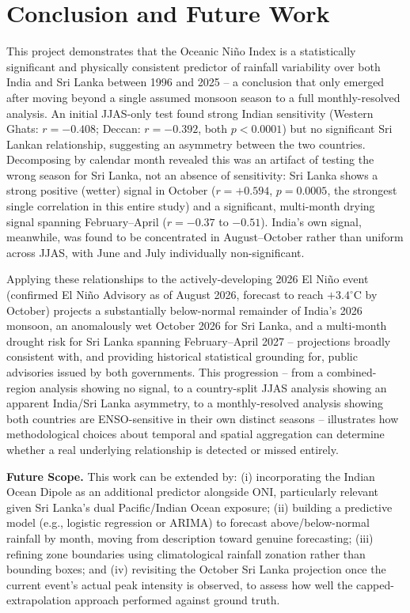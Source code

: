 \documentclass{article}
\begin{document}
\section{Conclusion and Future Work}

This project demonstrates that the Oceanic Ni\~{n}o Index is a statistically
significant and physically consistent predictor of rainfall variability over both
India and Sri Lanka between 1996 and 2025 -- a conclusion that only emerged after
moving beyond a single assumed monsoon season to a full monthly-resolved analysis.
An initial JJAS-only test found strong Indian sensitivity (Western Ghats: $r=-0.408$;
Deccan: $r=-0.392$, both $p<0.0001$) but no significant Sri Lankan relationship,
suggesting an asymmetry between the two countries. Decomposing by calendar month
revealed this was an artifact of testing the wrong season for Sri Lanka, not an
absence of sensitivity: Sri Lanka shows a strong positive (wetter) signal in October
($r=+0.594$, $p=0.0005$, the strongest single correlation in this entire study) and a
significant, multi-month drying signal spanning February--April ($r=-0.37$ to
$-0.51$). India's own signal, meanwhile, was found to be concentrated in
August--October rather than uniform across JJAS, with June and July individually
non-significant.

Applying these relationships to the actively-developing 2026 El Ni\~{n}o event
(confirmed El Ni\~{n}o Advisory as of August 2026, forecast to reach $+3.4^{\circ}$C
by October) projects a substantially below-normal remainder of India's 2026 monsoon,
an anomalously wet October 2026 for Sri Lanka, and a multi-month drought risk for Sri
Lanka spanning February--April 2027 -- projections broadly consistent with, and
providing historical statistical grounding for, public advisories issued by both
governments. This progression -- from a combined-region analysis showing no signal,
to a country-split JJAS analysis showing an apparent India/Sri Lanka asymmetry, to a
monthly-resolved analysis showing both countries are ENSO-sensitive in their own
distinct seasons -- illustrates how methodological choices about temporal and spatial
aggregation can determine whether a real underlying relationship is detected or
missed entirely.

\textbf{Future Scope.} This work can be extended by: (i) incorporating the Indian
Ocean Dipole as an additional predictor alongside ONI, particularly relevant given
Sri Lanka's dual Pacific/Indian Ocean exposure; (ii) building a predictive model
(e.g., logistic regression or ARIMA) to forecast above/below-normal rainfall by month,
moving from description toward genuine forecasting; (iii) refining zone boundaries
using climatological rainfall zonation rather than
bounding boxes; and (iv) revisiting the October Sri Lanka projection once the
current event's actual peak intensity is observed, to assess how well the
capped-extrapolation approach performed against ground truth.
\end{document}
